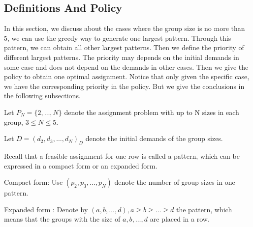 %
%


\newpage

\subsection{Definitions And Policy}

In this section, we discuss about the cases where the group size is no more than 5, we can use the greedy way to generate one largest pattern. Through this pattern, we can obtain all other largest patterns. Then we define the priority of different largest patterns. The priority may depends on the initial demands in some case and does not depend on the demands in other cases. Then we give the policy to obtain one optimal assignment. Notice that only given the specific case, we have the corresponding priority in the policy. But we give the conclusions in the following subsections.

\begin{definition}
Let $P_N = \{2,\ldots,N\}$ denote the assignment problem with up to N sizes in each group, $3 \leq N \leq 5$.

Let $D = (d_{2},d_{3}, \ldots, d_{N})_D$ denote the initial demands of the group sizes.
\end{definition}

Recall that a feasible assignment for one row is called a pattern, which can be expressed in a compact form or an expanded form.

Compact form: Use $(p_2,p_3,\ldots,p_N)$ denote the number of group sizes in one pattern.

Expanded form : Denote by $(a,b,\ldots,d), a \geq b \geq \ldots \geq d$ the pattern, which means that the groups with the size of $a,b, \ldots, d$ are placed in a row.


